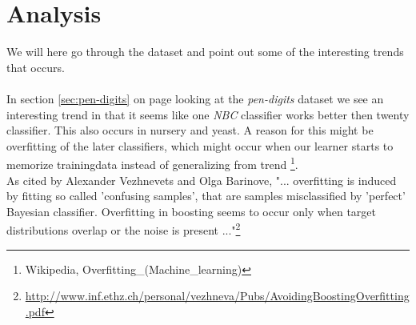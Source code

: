 \documentclass[12pt]{article}
\newcommand{\NBC}{\textit{NBC}}
\begin{document}
\pagebreak
\section{Analysis}
	We will here go through the dataset and point out some of the interesting trends that occurs.
	\\\\
	In section \ref{sec:pen-digits} on page \pageref{sec:pen-digits} looking at the \textit{pen-digits} dataset we see an interesting trend in that it seems like one \NBC{} classifier works better then twenty classifier. This also occurs in nursery and yeast. A reason for this might be overfitting of the later classifiers, which might occur when our learner starts to memorize trainingdata instead of generalizing from trend \footnote{Wikipedia, Overfitting\_(Machine\_learning)}. \\
	As cited by Alexander Vezhnevets and Olga Barinove, "... overfitting is induced by fitting so called 'confusing samples', that are samples misclassified by 'perfect' Bayesian classifier. Overfitting in boosting seems to occur only when target distributions overlap or the noise is present ..."\footnote{\url{http://www.inf.ethz.ch/personal/vezhneva/Pubs/AvoidingBoostingOverfitting.pdf}}\\
	
	
	
	
\end{document}

